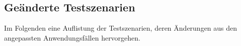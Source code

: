 \FloatBarrier
\subsection{Geänderte Testszenarien}

Im Folgenden eine Auflistung der Testszenarien, deren Änderungen aus den angepassten Anwendungsfällen hervorgehen.

